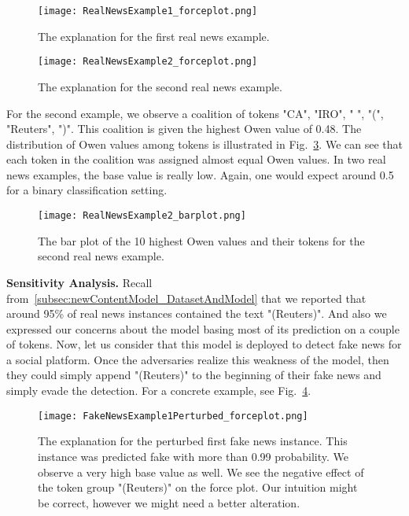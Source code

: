 \begin{figure}
    \centering
    \texttt{[image: RealNewsExample1\_forceplot.png]}
    \caption[The explanation for the first real news example.]{The explanation for the first real news example.}
    \label{fig:RealNewsExample1_forceplot}
\end{figure}
\begin{figure}
    \centering
    \texttt{[image: RealNewsExample2\_forceplot.png]}
    \caption[The explanation for the second real news example.]{The explanation for the second real news example.}
    \label{fig:RealNewsExample2_forceplot}
\end{figure}
For the second example, we observe a coalition of tokens "CA", "IRO", " ", "(", "Reuters", ")". This coalition is given the highest Owen value of 0.48. The distribution of Owen values among tokens is illustrated in Fig.~\ref{fig:RealNewsExample2_barplot}. We can see that each token in the coalition was assigned almost equal Owen values. In two real news examples, the base value is really low. Again, one would expect around 0.5 for a binary classification setting.\\
\begin{figure}
    \centering
    \texttt{[image: RealNewsExample2\_barplot.png]}
    \caption[The bar plot of the 10 highest Owen values and their tokens for the second real news example.]{The bar plot of the 10 highest Owen values and their tokens for the second real news example.}
    \label{fig:RealNewsExample2_barplot}
\end{figure}
\textbf{Sensitivity Analysis.} Recall from~\ref{subsec:newContentModel_DatasetAndModel} that we reported that around 95\% of real news instances contained the text "(Reuters)". And also we expressed our concerns about the model basing most of its prediction on a couple of tokens. Now, let us consider that this model is deployed to detect fake news for a social platform. Once the adversaries realize this weakness of the model, then they could simply append "(Reuters)" to the beginning of their fake news and simply evade the detection. For a concrete example, see Fig.~\ref{fig:FakeNewsExample1Perturbed_forceplot}.\\
\begin{figure}
    \centering
    \texttt{[image: FakeNewsExample1Perturbed\_forceplot.png]}
    \caption[The explanation for the perturbed first fake news instance.]{The explanation for the perturbed first fake news instance. This instance was predicted fake with more than 0.99 probability. We observe a very high base value as well. We see the negative effect of the token group "(Reuters)" on the force plot. Our intuition might be correct, however we might need a better alteration.}
    \label{fig:FakeNewsExample1Perturbed_forceplot}
\end{figure}
